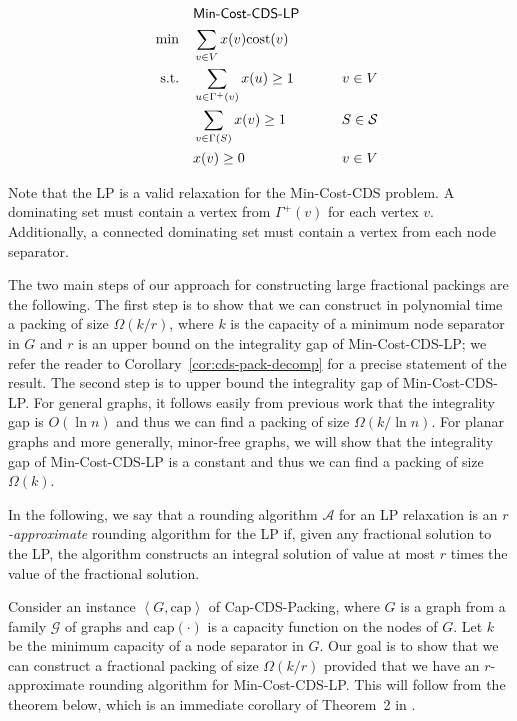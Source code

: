 \documentclass[11pt]{article}
\def\script#1{\mathcal{#1}}
\def\pair#1{\left<#1\right>}
\def\sA{\script{A}}
\def\sG{\script{G}}
\def\sS{\script{S}}
\def\prob#1{\textsf{\textup{#1}}\xspace}
\def\capacity{\mathrm{cap}}
\def\minCDSlp{\prob{\minCDS-LP}}
\def\capCDSpack{\prob{Cap-CDS-Packing}}
\def\minCDS{\prob{Min-Cost-CDS}}
\def\cost{\mathrm{cost}}
\begin{document}
\begin{center}
\begin{boxedminipage}{0.45\textwidth}
\vspace{-0.15in}
\begin{align*}
	&  \minCDSlp &\\
	\quad \min \quad & \sum_{v \in V} x(v) \cost(v) &\\
	\text{s.t.} \quad & \sum_{ u \in \Gamma^+(v)} x(u) \geq 1 \quad &
	v \in V\\
	& \sum_{v \in \Gamma(S)} x(v) \geq 1 \qquad\quad & S \in \sS\\
	& x(v) \geq 0 & v\in V
\end{align*}
\end{boxedminipage}
\end{center}

Note that the LP is a valid relaxation for the \minCDS problem. A
dominating set must contain a vertex from $\Gamma^+(v)$ for each
vertex $v$. Additionally, a connected dominating set must contain a
vertex from each node separator.

The two main steps of our approach for constructing large fractional
packings are the following. The first step is to show that we can
construct in polynomial time a packing of size $\Omega(k/r)$, where
$k$ is the capacity of a minimum node separator in $G$ and $r$ is an
upper bound on the integrality gap of \minCDSlp; we refer the reader
to Corollary~\ref{cor:cds-pack-decomp} for a precise statement of the
result.  The second step is to upper bound the integrality gap of
\minCDSlp. For general graphs, it follows easily from previous work
that the integrality gap is $O(\ln{n})$ and thus we can find a
packing of size $\Omega(k/\ln{n})$. For planar graphs and more
generally, minor-free graphs, we will show that the integrality gap
of \minCDSlp is a constant and thus we can find a packing of size
$\Omega(k)$.

In the following, we say that a rounding algorithm $\sA$ for an LP
relaxation is an \emph{$r$-approximate} rounding algorithm for the
LP if, given any fractional solution to the LP, the algorithm
constructs an integral solution of value at most $r$ times the value
of the fractional solution.

Consider an instance $\pair{G, \capacity}$ of \capCDSpack, where
$G$ is a graph from a family $\sG$ of graphs and $\capacity(\cdotp)$
is a capacity function on the nodes of $G$. Let $k$ be the minimum
capacity of a node separator in $G$. Our goal is to show that we can
construct a fractional packing of size $\Omega(k/r)$ provided that we
have an $r$-approximate rounding algorithm for \minCDSlp.  This will
follow from the theorem below, which is an immediate corollary of
Theorem~{2} in \cite{CarrV02}.
\end{document}
